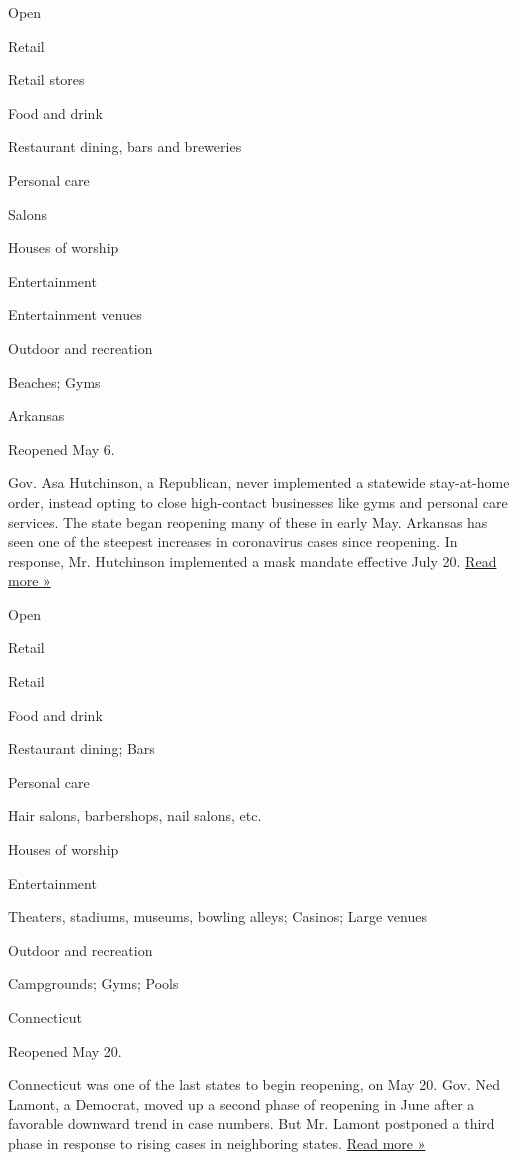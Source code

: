 Open

Retail

Retail stores

Food and drink

Restaurant dining, bars and breweries

Personal care

Salons

Houses of worship

Entertainment

Entertainment venues

Outdoor and recreation

Beaches; Gyms

Arkansas

Reopened May 6.

Gov. Asa Hutchinson, a Republican, never implemented a statewide
stay-at-home order, instead opting to close high-contact businesses like
gyms and personal care services. The state began reopening many of these
in early May. Arkansas has seen one of the steepest increases in
coronavirus cases since reopening. In response, Mr. Hutchinson
implemented a mask mandate effective July 20.
\href{https://www.kspr.com/content/news/Arkansas-governor-No-further-reopening-as-virus-cases-surge-571501921.html}{Read
more »}

Open

Retail

Retail

Food and drink

Restaurant dining; Bars

Personal care

Hair salons, barbershops, nail salons, etc.

Houses of worship

Entertainment

Theaters, stadiums, museums, bowling alleys; Casinos; Large venues

Outdoor and recreation

Campgrounds; Gyms; Pools

Connecticut

Reopened May 20.

Connecticut was one of the last states to begin reopening, on May 20.
Gov. Ned Lamont, a Democrat, moved up a second phase of reopening in
June after a favorable downward trend in case numbers. But Mr. Lamont
postponed a third phase in response to rising cases in neighboring
states.
\href{https://www.courant.com/coronavirus/hc-news-coronavirus-clb-reopening-paused-20200707-lnivp6hb4redtphmjj7yif3kci-story.html}{Read
more »}

